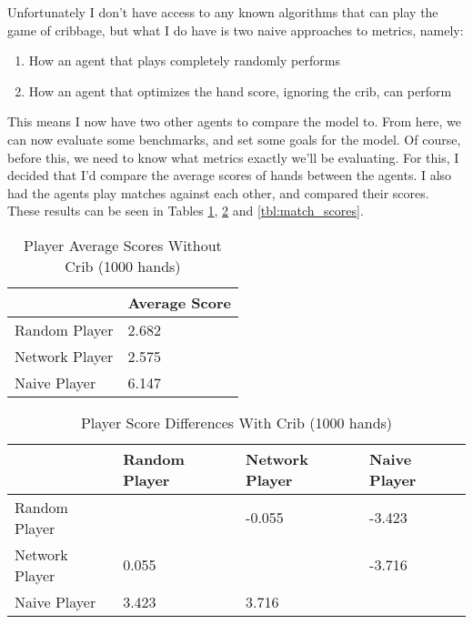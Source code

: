 \documentclass[]{article}
\begin{document}
Unfortunately I don't have access to any known algorithms that can play the game of cribbage, but what I do have is two naive approaches to metrics, namely:
\begin{enumerate}
    \item How an agent that plays completely randomly performs
    \item How an agent that optimizes the hand score, ignoring the crib, can perform
\end{enumerate}

This means I now have two other agents to compare the model to. From here, we can now evaluate some benchmarks, and set some goals for the model. Of course, before this, we need to know what metrics exactly we'll be evaluating. For this, I decided that I'd compare the average scores of hands between the agents. I also had the agents play matches against each other, and compared their scores. These results can be seen in Tables \ref{tbl:scores}, \ref{tbl:score_diffs} and \ref{tbl:match_scores}. 

\begin{table}[ht]
    \caption {Player Average Scores Without Crib (1000 hands)} \label{tbl:scores}
    \begin{tabular}{l|l|}
    \cline{2-2}
                                         & Average Score                                        \\ \hline
    \multicolumn{1}{|l|}{Random Player}  & 2.682                                                \\ \hline
    \multicolumn{1}{|l|}{Network Player} & 2.575                                                \\ \hline
    \multicolumn{1}{|l|}{Naive Player}   & 6.147                                                \\ \hline
    \end{tabular}
\end{table}

\begin{table}[ht]
    \caption {Player Score Differences With Crib (1000 hands)} \label{tbl:score_diffs}
    \begin{tabular}{l|l|l|l|}
    \cline{2-4}
                                         & Random Player                                   & Network Player           & Naive Player             \\ \hline
    \multicolumn{1}{|l|}{Random Player}  & \cellcolor[HTML]{000000}                        & -0.055                   & -3.423                   \\ \hline
    \multicolumn{1}{|l|}{Network Player} & 0.055                                           & \cellcolor[HTML]{000000} & -3.716                   \\ \hline
    \multicolumn{1}{|l|}{Naive Player}   & 3.423                                           & 3.716                    & \cellcolor[HTML]{000000} \\ \hline
    \end{tabular}
\end{table}
\end{document}
